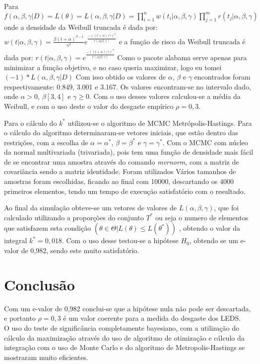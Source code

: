 \documentclass{article} %
\begin{document}
     Para $f(\alpha,\beta,\gamma|D) = L(\theta) = L(\alpha,\beta,\gamma|D)=\prod^n_{i=1}w(t_{i}|\alpha,\beta,\gamma) \prod^m_{j=1}r(t_{j}|\alpha,\beta,\gamma)$ onde a densidade da Weibull truncada é dada por:$w(t|\alpha, \beta, \gamma) = \frac{\beta(t + \alpha)^{\beta - 1}}{\gamma^{\beta}} e^{\frac{-((t + \alpha)/\gamma)^{\beta}}{r(\alpha|\beta, \gamma)}}$ e a função de risco da Weibull truncada é dada por: $r(t|\alpha, \beta, \gamma) = e^{\frac{-((t + \alpha)/\gamma)^{\beta}}{r(\alpha|\beta, \gamma)}}$ Como o pacote alabama serve apenas para minimizar a função objetivo, e no caso queria  maximizar, logo eu tomei $(-1)*{L(\alpha,\beta,\gamma|D)}$ Com isso obtido os valores de $\alpha$, $\beta$ e $\gamma$ encontrados foram respectivamente: 0.849, 3.001 e 3.167. Os valores encontram-se no intervalo dado, onde $\alpha >0$, $\beta[3,4]$ e $\gamma\geq 0$. Com o uso desses valores  calculou-se a média da Weibull, e  com o uso deste o valor do desgaste empírico $\rho = 0,3$. 

Para o cálculo do $k^*$ utilizou-se o algoritmo de MCMC Metrópolis-Hastings.  Para o cálculo do algoritmo determinaram-se vetores iniciais, que estão dentro das restrições, com a escolha de $\alpha = \alpha^*$, $\beta = \beta^*$ e $\gamma = \gamma^*$. Com o MCMC com núcleo da normal multivariada (trivariada), pois tem uma função de densidade mais fácil de se encontrar uma amostra através do comando \textit{mvrnorm}, com a matriz de covariância sendo a matriz identidade. Foram utilizados Vários tamanhos de amostras foram escolhidas, ficando ao final com 10000, descartando os 4000 primeiros elementos, tendo um tempo de execução satisfatório com o resultado.

Ao final da simulação obteve-se um vetores de valores de $L(\alpha, \beta, \gamma)$, que foi calculado utilizando a proporções do conjunto $T^*$ ou seja o numero de elementos que satisfazem esta condição $(\theta \in \Theta | L(\theta) \le L(\theta^*))$ , obtendo o valor da integral $k^*= 0,018$. Com o uso desse testou-se a hipótese $H_0$, obtendo se um e-valor de 0,982, sendo este muito satisfatório.
	
\section{Conclusão}
	
	Com um e-valor de 0,982 conclui-se que a hipótese nula não pode ser descartada, e portanto $\rho=0,3$ é um valor coerente para a medida do desgaste dos LEDS.
\\\indent O uso do teste de significância completamente bayesiano, com a utilização do cálculo da maximização através do uso de algoritmo de otimização e cálculo da integração com o uso de Monte Carlo e do algoritmo de Metropolis-Hastings se mostraram muito eficientes.
\end{document}
